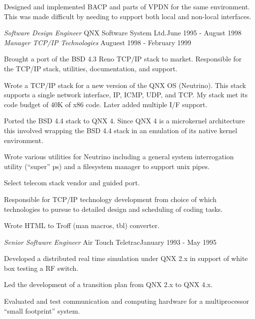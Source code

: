 \documentclass[margin]{res}
\begin{document}
\begin{resume}
                Designed and implemented BACP and parts of VPDN for the same
                environment. This was made difficult by needing to support both local
                and non-local interfaces.

                {\sl\large Software Design Engineer } QNX Software System Ltd.\hfill June 1995 - August 1998 \\
                {\sl Manager TCP/IP Technologies } \hfill Auguest 1998 - February 1999

                Brought a port of the BSD 4.3 Reno TCP/IP stack to
                market. Responsible for the TCP/IP stack, utilities,
                documentation, and support.

                Wrote a TCP/IP stack for a new version of the QNX
                OS (Neutrino). This stack supports a single network
                interface, IP, ICMP, UDP, and TCP. My stack met its
                code budget of 40K of x86 code. Later added multiple
                I/F support.

                Ported the BSD 4.4 stack to QNX 4. Since QNX 4 is a
                microkernel architecture this involved wrapping the
                BSD 4.4 stack in an emulation of its native kernel
                environment.

                Wrote various utilities for Neutrino including a general
                system interrogation utility (“super” ps) and a
                filesystem manager to support unix pipes.

                Select telecom stack vendor and guided port.

                Responsible for TCP/IP technology development from choice
                of which technologies to pursue to detailed design and
                scheduling of coding tasks.

                Wrote HTML to Troff (man macros, tbl) converter.

                {\sl\large Senior Software Engineer } Air Touch Teletrac\hfill January 1993 - May 1995

                Developed a distributed real time simulation under QNX
                2.x in support of white box testing a RF switch.

                Led the development of a transition plan from QNX 2.x
                to QNX 4.x.

                Evaluated and test communication and computing hardware
                for a multiprocessor “small footprint” system.


\end{resume}
\end{document}
